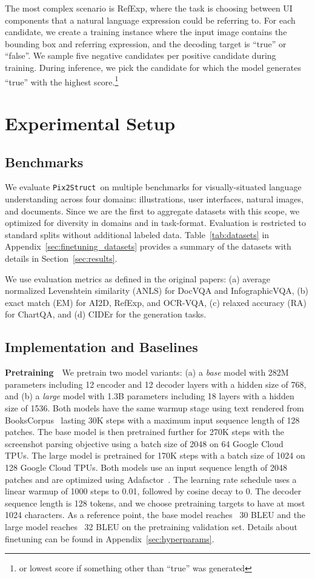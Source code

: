 \documentclass{article} \usepackage[accepted]{icml2023}
\newcommand\ourmodel{{\texttt{Pix2Struct}}}
\begin{document}
The most complex scenario is RefExp, where the task is choosing between UI components that a natural language expression could be referring to. For each candidate, we create a training instance where the input image contains the bounding box and referring expression, and the decoding target is ``true'' or ``false''. We sample five negative candidates per positive candidate during training. During inference, we pick the candidate for which the model generates ``true'' with the highest score.\footnote{or lowest score if something other than ``true'' was generated}
 

\section{Experimental Setup}
\subsection{Benchmarks}
We evaluate \ourmodel~on multiple benchmarks for visually-situated language understanding across four domains: illustrations, user interfaces, natural images, and documents. Since we are the first to aggregate datasets with this scope, we optimized for diversity in domains and in task-format. Evaluation is restricted to standard splits without additional labeled data. 
Table~\ref{tab:datasets} in Appendix~\ref{sec:finetuning_datasets} provides a summary of the datasets with details in Section~\ref{sec:results}.

We use evaluation metrics as defined in the original papers: (a) average normalized Levenshtein similarity (ANLS) for DocVQA and InfographicVQA, (b) exact match (EM) for AI2D, RefExp, and OCR-VQA, (c) relaxed accuracy (RA) for ChartQA, and (d) CIDEr for the generation tasks.

\subsection{Implementation and Baselines}
\textbf{Pretraining}~~We pretrain two model variants: (a) a \emph{base} model with 282M parameters including 12 encoder and 12 decoder layers with a hidden size of 768, and (b) a \emph{large} model with 1.3B parameters including 18 layers with a hidden size of 1536. Both models have the same warmup stage using text rendered from BooksCorpus~\citep{books} lasting 30K steps with a maximum input sequence length of 128 patches. The base model is then pretrained further for 270K steps with the screenshot parsing objective using a batch size of 2048 on 64 Google Cloud TPUs. 
The large model is pretrained for 170K steps with a batch size of 1024 on 128 Google Cloud TPUs. 
Both models use an input sequence length of 2048 patches and are optimized using Adafactor~\citep{shazeer2018adafactor}. The learning rate schedule uses a linear warmup of 1000 steps to 0.01, followed by cosine decay to 0. The decoder sequence length is 128 tokens, and we choose pretraining targets to have at most 1024 characters. As a reference point, the base model reaches ~30 BLEU and the large model reaches ~32 BLEU on the pretraining validation set. 
Details about finetuning can be found in Appendix~\ref{sec:hyperparams}.
\end{document}
